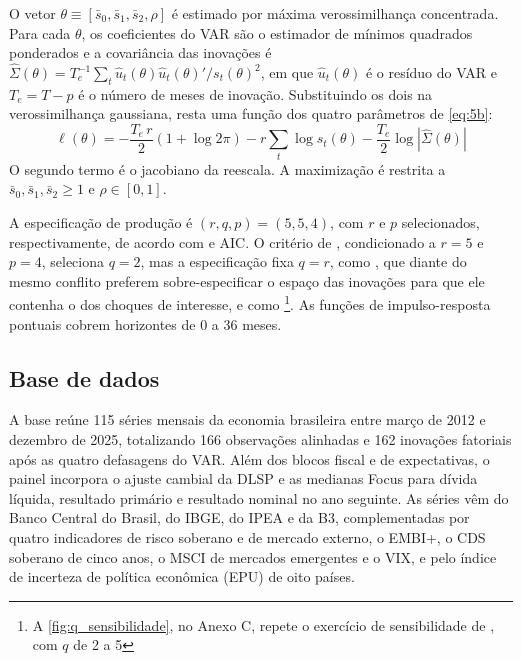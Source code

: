 \documentclass[preprint,authoryear,review,12pt]{elsarticle}
\begin{document}
O vetor $\theta \equiv [\bar{s}_0, \bar{s}_1, \bar{s}_2, \rho]$ é estimado por máxima verossimilhança concentrada. Para cada $\theta$, os coeficientes do VAR são o estimador de mínimos quadrados ponderados e a covariância das inovações é $\hat{\Sigma}(\theta) = T_e^{-1}\sum_t \hat{u}_t(\theta)\hat{u}_t(\theta)'/s_t(\theta)^2$, em que $\hat{u}_t(\theta)$ é o resíduo do VAR e $T_e = T - p$ é o número de meses de inovação. Substituindo os dois na verossimilhança gaussiana, resta uma função dos quatro parâmetros de \ref{eq:5b}:
\begin{equation}\label{eq:5c}
    \ell(\theta) = -\frac{T_e\,r}{2}\left(1 + \log 2\pi\right) - r\sum_{t} \log s_t(\theta) - \frac{T_e}{2}\log\left|\hat{\Sigma}(\theta)\right|
\end{equation}
O segundo termo é o jacobiano da reescala. A maximização é restrita a $\bar{s}_0, \bar{s}_1, \bar{s}_2 \geq 1$ e $\rho \in [0, 1]$.


A especificação de produção é $(r, q, p) = (5, 5, 4)$, com $r$ e $p$ selecionados, respectivamente, de acordo com \cite{bai-ng} e AIC. O critério de \cite{amengual2007consistent}, condicionado a $r = 5$ e $p = 4$, seleciona $q = 2$, mas a especificação fixa $q = r$, como \cite{STOCK2016415}, que diante do mesmo conflito preferem sobre-especificar o espaço das inovações para que ele contenha o dos choques de interesse, e como \cite{alessi}\footnote{A \autoref{fig:q_sensibilidade}, no Anexo C, repete o exercício de sensibilidade de \cite{alessi}, com $q$ de 2 a 5}. As funções de impulso-resposta pontuais cobrem horizontes de 0 a 36 meses.

\subsection{Base de dados}

A base reúne 115 séries mensais da economia brasileira entre março de 2012 e dezembro de 2025, totalizando 166 observações alinhadas e 162 inovações fatoriais após as quatro defasagens do VAR. Além dos blocos fiscal e de expectativas, o painel incorpora o ajuste cambial da DLSP e as medianas Focus para dívida líquida, resultado primário e resultado nominal no ano seguinte. As séries vêm do Banco Central do Brasil, do IBGE, do IPEA e da B3, complementadas por quatro indicadores de risco soberano e de mercado externo, o EMBI+, o CDS soberano de cinco anos, o MSCI de mercados emergentes e o VIX, e pelo índice de incerteza de política econômica (EPU) de oito países.
\end{document}
